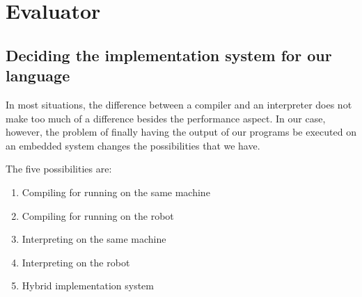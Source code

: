 \section{Evaluator}

\subsection{Deciding the implementation system for our language}\label{Evaluator:Deciding}

In most situations, the difference between a compiler and an interpreter does not make too much of a difference besides the performance aspect. In our case, however, the problem of finally having the output of our programs be executed on an embedded system changes the possibilities that we have. 

The five possibilities are: 
\begin{enumerate}
    \item Compiling for running on the same machine
    \item Compiling for running on the robot
    \item Interpreting on the same machine
    \item Interpreting on the robot
    \item Hybrid implementation system
\end{enumerate}


